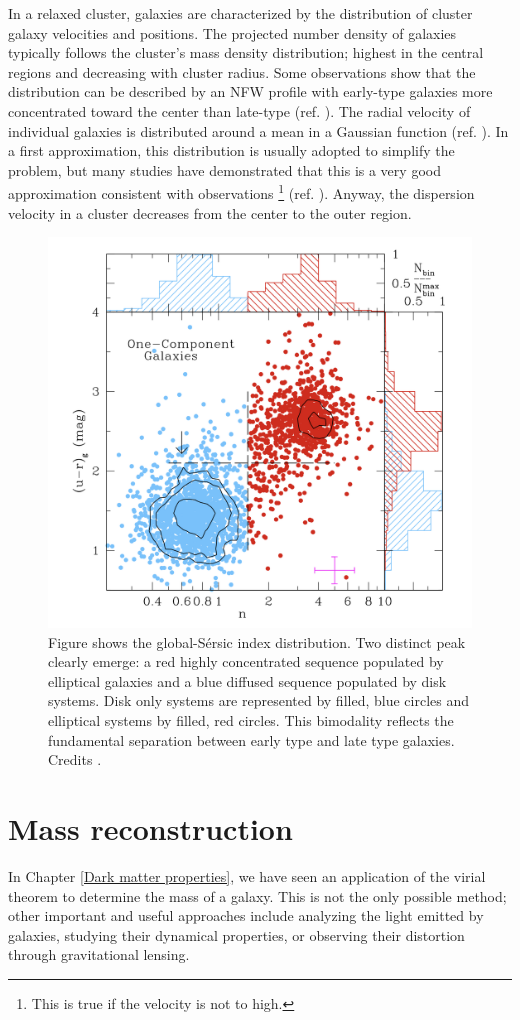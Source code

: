In a relaxed cluster, galaxies are characterized by the distribution of cluster galaxy velocities and positions.
The projected number density of galaxies typically follows the cluster's mass density distribution; highest in the central regions and decreasing with cluster radius. Some observations show that the distribution can be described by an NFW profile with early-type galaxies more concentrated toward the center than late-type (ref. \cite{CLASH-VLT:-The-Inner-Slope-of-the-MACS-J1206.2-0847-Dark-Matter-Density-Profile}).
The radial velocity of individual galaxies is distributed around a mean in a Gaussian function (ref. \cite{Sarazin2002}). In a first approximation, this distribution is usually adopted to simplify the problem, but many studies have demonstrated that this is a very good approximation consistent with observations \footnote{This is true if the velocity is not to high.} (ref. \cite{The_Velocity_Distribution_of_Galaxies_in_Clusters_1977}).
Anyway, the dispersion velocity in a cluster decreases from the center to the outer region.
\begin{figure}[h!]
\centering
    \includegraphics[width=0.47\linewidth]{Images/Chapter3/Galaxy distribution.png}
    \caption[Galaxy distribution]{Figure shows the global-Sérsic index distribution. Two distinct peak clearly emerge: a red highly concentrated sequence populated by elliptical galaxies and a blue diffused sequence populated by disk systems. Disk only systems are represented by filled, blue circles and elliptical systems by filled, red circles. This bimodality reflects the fundamental separation between early type and late type galaxies. Credits \cite{Cameron_2009}.}
\label{Galaxy distribution}
\end{figure}

\section{Mass reconstruction}
In Chapter \ref{Dark matter properties}, we have seen an application of the virial theorem to determine the mass of a galaxy. This is not the only possible method; other important and useful approaches include analyzing the light emitted by galaxies, studying their dynamical properties, or observing their distortion through gravitational lensing.


